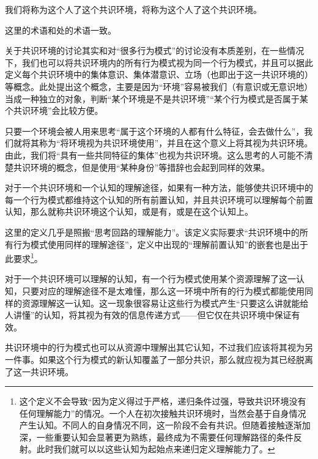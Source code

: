 我们将称为这个人了这个共识环境，将称为这个人了这个共识环境。
\begin{explain}
这里的术语和处的术语一致。

关于共识环境的讨论其实和对“很多行为模式”的讨论没有本质差别，在一些情况下，我们也可以将共识环境内的所有行为模式视为同一个行为模式，并且可以据此定义每个共识环境中的集体意识、集体潜意识、立场（也即出于这一共识环境的）等概念。此处提出这个概念，主要是因为“环境”容易被我们（有意识或无意识地）当成一种独立的对象，判断“某个环境是不是共识环境”“某个行为模式是否属于某个共识环境”会比较方便。

只要一个环境会被人用来思考“属于这个环境的人都有什么特征，会去做什么”，我们就将其称为“将环境视为共识环境使用”，并且在这个意义上将其视为共识环境。由此，我们将“具有一些共同特征的集体”也视为共识环境。这么思考的人可能不清楚共识环境的概念，但是使用“某种身份”等措辞也会起到同样的效果。
\end{explain}
对于一个共识环境和一个认知的理解途径，如果有一种方法，能够使共识环境中的每一个行为模式都维持这个认知的所有前置认知，并且共识环境可以理解每个前置认知，那么就称共识环境这个认知，或是有\label{def:共识环境的理解能力}，或是在这个认知上。
\begin{explain}
这里的定义几乎是照搬“思考回路的理解能力”。该定义实际要求“共识环境中的所有行为模式使用同样的理解途径”，定义中出现的“理解前置认知”的嵌套也是出于此要求\footnote{这个定义不会导致“因为定义得过于严格，递归条件过强，导致共识环境没有任何理解能力”的情况。一个人在初次接触共识环境时，当然会基于自身情况产生认知。不同人的自身情况不同，这一阶段不会有共识。但随着接触逐渐加深，一些重要认知会显著更为熟练，最终成为不需要任何理解路径的条件反射。此时我们就可以以这些认知为起始点来递归定义理解能力了。}。

对于一个共识环境可以理解的认知，有一个行为模式使用某个资源理解了这一认知，只要对应的理解途径不是太难懂，那么这一环境中所有的行为模式都能使用同样的资源理解这一认知。这一现象很容易让这些行为模式产生“只要这么讲就能给人讲懂”的认知，将其视为有效的信息传递方式——但它仅在共识环境中保证有效。

共识环境中的行为模式也可以从资源中理解出其它认知，不过我们应该将其视为另一件事。如果这个行为模式的新认知覆盖了一部分共识，那么就应视为其已经脱离了这一共识环境。

\end{explain}
